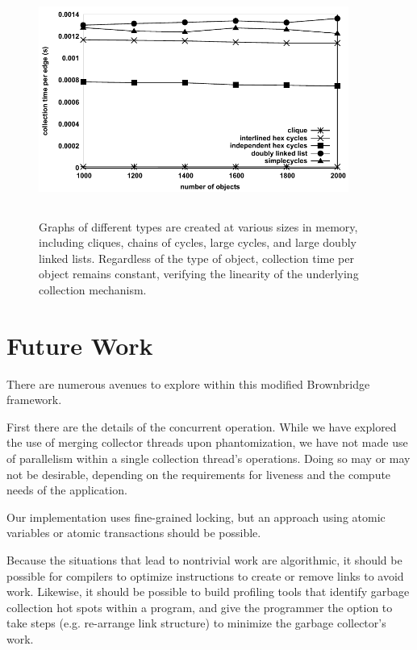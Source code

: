 \begin{figure}[h!]
  \centering
  \includegraphics[height=3.0in,width=4.0in]{figs/linearity}
  \caption{
  Graphs of different types are created at various sizes in memory,
  including cliques, chains of cycles, large cycles, and large doubly
  linked lists. Regardless of the type of object, collection time
  per object remains constant, verifying the linearity of the underlying
  collection mechanism.
  }
   \label{fig:linearity}
  \end{figure}

\section{Future Work}
\label{section:future-work}
There are numerous avenues to explore within this modified Brownbridge framework.

First there are the details of the concurrent operation. While we have explored
the use of merging collector threads upon phantomization, we have not
made use of parallelism within a single collection thread's operations.
Doing so may or may not be desirable, depending on the requirements
for liveness and the compute needs of the application.

Our implementation uses fine-grained locking, but an approach using atomic
variables or atomic transactions should be possible.

Because the situations that lead to nontrivial work are algorithmic, it
should be possible for compilers to optimize instructions to create or
remove links to avoid work. Likewise, it should be possible to build
profiling tools that identify garbage collection
hot spots within a program, and give the programmer the option to take
steps (e.g. re-arrange link structure) to minimize the garbage collector's work.

